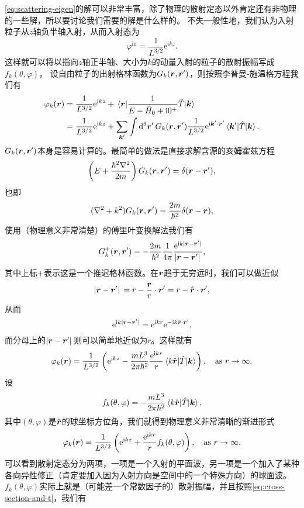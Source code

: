 \documentclass[UTF8, a4paper]{ctexart}
\newcommand*{\ee}{\mathrm{e}}
\newcommand*{\ii}{\mathrm{i}}
\begin{document}
\eqref{eq:scattering-eigen}的解可以非常丰富，除了物理的散射定态以外肯定还有非物理的一些解，所以要讨论我们需要的解是什么样的。
不失一般性地，我们认为入射粒子从$z$轴负半轴入射，从而入射态为
\[
    \varphi^\text{in} = \frac{1}{L^{3/2}} \ee^{\ii k z}.
\]
这样就可以将以指向$z$轴正半轴、大小为$k$的动量入射的粒子的散射振幅写成$f_k(\theta, \varphi)$。
设自由粒子的出射格林函数为$G_k(\vb*{r}, \vb*{r}')$，则按照李普曼-施温格方程我们有
\[
    \begin{aligned}
        \varphi_k(\vb*{r}) &= \frac{1}{L^{3/2}} \ee^{\ii k z} + \mel{\vb*{r}}{\frac{1}{E - \hat{H}_0 + \ii 0^+} \hat{T}}{\vb*{k}} \\
        &= \frac{1}{L^{3/2}} \ee^{\ii k z} + \sum_{\vb*{k}'} \int \dd[3]{\vb*{r}'} G_k(\vb*{r}, \vb*{r}') \frac{1}{L^{3/2}} \ee^{\ii \vb*{k}' \cdot \vb*{r}'} \mel*{\vb*{k}'}{\hat{T}}{\vb*{k}}.
    \end{aligned}
\]
$G_k(\vb*{r}, \vb*{r}')$本身是容易计算的。最简单的做法是直接求解含源的亥姆霍兹方程
\[
    \left(E + \frac{\hbar^2 \laplacian}{2m} \right) G_k(\vb*{r}, \vb*{r}') = \delta(\vb*{r} - \vb*{r}'),
\]
也即
\[
    (\laplacian + k^2) G_k(\vb*{r}, \vb*{r}') = \frac{2m}{\hbar^2} \delta(\vb*{r} - \vb*{r}),
\]
使用（物理意义非常清楚）的傅里叶变换解法我们有
\[
    G_k^+(\vb*{r}, \vb*{r}') = - \frac{2m}{\hbar^2} \frac{1}{4\pi} \frac{\ee^{\ii k \abs*{\vb*{r} - \vb*{r}'}}}{\abs*{\vb*{r} - \vb*{r}'}},
\]
其中上标$+$表示这是一个推迟格林函数。在$\vb*{r}$趋于无穷远时，我们可以做近似
\[
    \abs*{\vb*{r} - \vb*{r}'} = r - \frac{\vb*{r}}{r} \cdot \vb*{r}' = r - \hat{\vb*{r}} \cdot \vb*{r}',
\]
从而
\[
    \ee^{\ii k \abs*{\vb*{r} - \vb*{r}'}} = \ee^{\ii k r} \ee^{- \ii k \hat{\vb*{r}} \cdot \vb*{r}'},
\]
而分母上的$\abs*{\vb*{r} - \vb*{r}'}$则可以简单地近似为$r$。这样就有
\[
    \varphi_k(\vb*{r}) = \frac{1}{L^{3/2}} \left( \ee^{\ii k z} - \frac{m L^3}{2\pi \hbar^2} \frac{\ee^{\ii k r}}{r} \mel{k \hat{\vb*{r}}}{\hat{T}}{\vb*{k}} \right) , \quad \text{as $r \to \infty$}.
\]
设
\begin{equation}
    f_k(\theta, \varphi) = - \frac{m L^3}{2\pi \hbar^2} \mel{k \hat{\vb*{r}}}{\hat{T}}{\vb*{k}} ,
\end{equation}
其中$(\theta, \varphi)$是$\hat{\vb*{r}}$的球坐标方位角，我们就得到物理意义非常清晰的渐进形式
\begin{equation}
    \varphi_k(\vb*{r}) = \frac{1}{L^{3/2}} \left( \ee^{\ii k z} + \frac{\ee^{\ii k r}}{r} f_k(\theta, \varphi) \right) , \quad \text{as $r \to \infty$}.
    \label{eq:infty-in-box}
\end{equation}
可以看到散射定态分为两项，一项是一个入射的平面波，另一项是一个加入了某种各向异性修正（肯定要加入因为入射方向是空间中的一个特殊方向）的球面波。$f_k(\theta, \varphi)$实际上就是（可能差一个常数因子的）散射振幅，并且按照\eqref{eq:cross-section-and-t}，我们有
\end{document}
